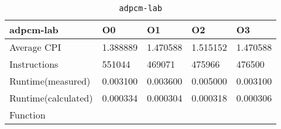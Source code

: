 \begin{table}[ht!]
\centering
\caption{\texttt{adpcm-lab}}
\label{tab:adpcm-lab}
\begin{tabular}{|l|l|l|l|l|}
\hline
\textbf{adpcm-lab}	&	\textbf{O0}	&	\textbf{O1}	&	\textbf{O2}	&	\textbf{O3}	\\\hline\hline
Average CPI	&	1.388889	&	1.470588	&	1.515152	&	1.470588	\\\hline
Instructions	&	551044	&	469071	&	475966	&	476500	\\\hline
Runtime(measured)	&	0.003100	&	0.003600	&	0.005000	&	0.003100	\\\hline
Runtime(calculated)	&	0.000334	&	0.000304	&	0.000318	&	0.000306	\\\hline
Function	&		&		&		&		\\\hline
\end{tabular}
\end{table}

